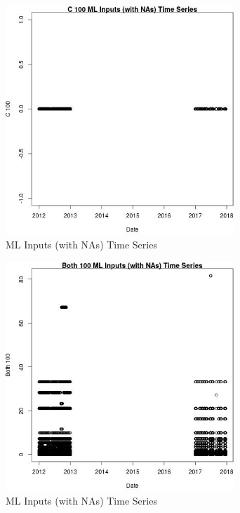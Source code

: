 \begin{figure} 
\centering  
\includegraphics[width=0.77\textwidth]{Code_Outputs/Report_ML_input_PM25_Step4_part_e_de_duplicated_aves_compiled_2019-05-14wNAs_C_100vDate.jpg} 
\caption{\label{fig:Report_ML_input_PM25_Step4_part_e_de_duplicated_aves_compiled_2019-05-14wNAsC_100vDate}ML Inputs (with NAs) Time Series} 
\end{figure} 
 

\begin{figure} 
\centering  
\includegraphics[width=0.77\textwidth]{Code_Outputs/Report_ML_input_PM25_Step4_part_e_de_duplicated_aves_compiled_2019-05-14wNAs_Both_100vDate.jpg} 
\caption{\label{fig:Report_ML_input_PM25_Step4_part_e_de_duplicated_aves_compiled_2019-05-14wNAsBoth_100vDate}ML Inputs (with NAs) Time Series} 
\end{figure} 
 

